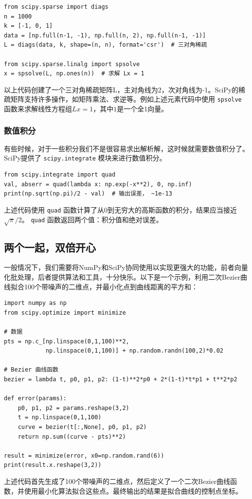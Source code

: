 \begin{verbatim}
from scipy.sparse import diags
n = 1000
k = [-1, 0, 1]
data = [np.full(n-1, -1), np.full(n, 2), np.full(n-1, -1)]
L = diags(data, k, shape=(n, n), format='csr')  # 三对角稀疏

from scipy.sparse.linalg import spsolve
x = spsolve(L, np.ones(n))  # 求解 Lx = 1
\end{verbatim}
以上代码创建了一个三对角稀疏矩阵L，主对角线为2，次对角线为-1。SciPy的稀疏矩阵支持许多操作，如矩阵乘法、求逆等。例如上述元素代码中使用 \texttt{spsolve} 函数来求解线性方程组$Lx = 1$，其中$1$是一个全1向量。

\subsubsection{数值积分}

有些时候，对于一些积分我们不是很容易求出解析解，这时候就需要数值积分了。SciPy提供了 \texttt{scipy.integrate} 模块来进行数值积分。
\begin{verbatim}
from scipy.integrate import quad
val, abserr = quad(lambda x: np.exp(-x**2), 0, np.inf)
print(np.sqrt(np.pi)/2 - val)  # 输出误差， ~1e-13
\end{verbatim}
上述代码使用 \texttt{quad} 函数计算了从0到无穷大的高斯函数的积分，结果应当接近$\sqrt{\pi}/2$。 \texttt{quad} 函数返回两个值：积分值和绝对误差。

\subsection{两个一起，双倍开心}

一般情况下，我们需要将NumPy和SciPy协同使用以实现更强大的功能，前者向量化批处理，后者提供算法和工具，十分快乐。以下是一个示例，利用二次Bezier曲线拟合100个带噪声的二维点，并最小化点到曲线距离的平方和：
\begin{verbatim}
import numpy as np
from scipy.optimize import minimize

# 数据
pts = np.c_[np.linspace(0,1,100)**2,
            np.linspace(0,1,100)] + np.random.randn(100,2)*0.02

# Bezier 曲线函数
bezier = lambda t, p0, p1, p2: (1-t)**2*p0 + 2*(1-t)*t*p1 + t**2*p2

def error(params):
    p0, p1, p2 = params.reshape(3,2)
    t = np.linspace(0,1,100)
    curve = bezier(t[:,None], p0, p1, p2)
    return np.sum((curve - pts)**2)

result = minimize(error, x0=np.random.rand(6))
print(result.x.reshape(3,2))
\end{verbatim}
上述代码首先生成了100个带噪声的二维点，然后定义了一个二次Bezier曲线函数，并使用最小化算法拟合这些点。最终输出的结果是拟合曲线的控制点坐标。

